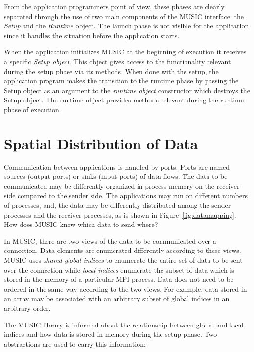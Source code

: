 \documentclass[a4paper,twoside]{report}
\begin{document}
From the application programmers point of view, these phases are
clearly separated through the use of two main components of the
MUSIC interface: the \emph{Setup} and the \emph{Runtime} object.  The
launch phase is not visible for the application since it handles the
situation before the application starts.

When the application initializes MUSIC at the beginning of execution
it receives a specific \emph{Setup object}.  This object gives access
to the functionality relevant during the setup phase via its methods.
When done with the setup, the application program makes the transition
to the runtime phase by passing the Setup object as an argument to the
\emph{runtime object} constructor which destroys the Setup object.
The runtime object provides methods relevant during the runtime phase
of execution.

\section{Spatial Distribution of Data}
\label{sec:spatialdist}

Communication between applications is handled by ports.  Ports are
named sources (output ports) or sinks (input ports) of data flows.
The data to be communicated may be differently organized in process
memory on the receiver side compared to the sender side.  The
applications may run on different numbers of processes, and, the data
may be differently distributed among the sender processes and the
receiver processes, as is shown in Figure~\ref{fig:datamapping}.  How
does MUSIC know which data to send where?

In MUSIC, there are two views of the data to be communicated over a
connection.  Data elements are enumerated differently according to
these views.  MUSIC uses \emph{shared global indices} to enumerate the entire set of data to be
sent over the connection while \emph{local indices}
enumerate the subset of data which is stored in the memory of a
particular MPI process.  Data does not need to be ordered in the same
way according to the two views.  For example, data stored in an array
may be associated with an arbitrary subset of global indices in an
arbitrary order.

The MUSIC library is informed about the relationship between global
and local indices and how data is stored in memory during the setup
phase.  Two abstractions are used to carry this information:
\end{document}
